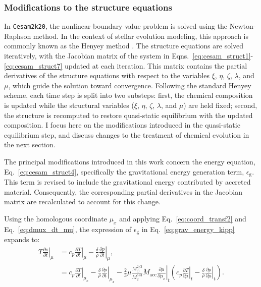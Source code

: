 \documentclass[12pt,a4paper]{article}
\newcommand{\mr}{\mathrm}
\newcommand{\pfird}[2][]{\frac{\partial#1}{\partial#2}}
\begin{document}
\subsubsection{Modifications to the structure equations}
\label{sec:accretion_struct_eq}

In \texttt{Cesam2k20}, the nonlinear boundary value problem is solved using the Newton-Raphson method. In the context of stellar evolution modeling, this approach is commonly known as the Henyey method \parencite{HenyeyEtAl1959}. The structure equations are solved iteratively, with the Jacobian matrix of the system in Eqns.~\eqref{eq:cesam_struct1}-\eqref{eq:cesam_struct7} updated at each iteration. This matrix contains the partial derivatives of the structure equations with respect to the variables $\xi$, $\eta$, $\zeta$, $\lambda$, and $\mu$, which guide the solution toward convergence. Following the standard Henyey scheme, each time step is split into two substeps: first, the chemical composition is updated while the structural variables ($\xi$, $\eta$, $\zeta$, $\lambda$, and $\mu$) are held fixed; second, the structure is recomputed to restore quasi-static equilibrium with the updated composition. I focus here on the modifications introduced in the quasi-static equilibrium step, and discuss changes to the treatment of chemical evolution in the next section.

The principal modifications introduced in this work concern the energy equation, Eq.~\eqref{eq:cesam_struct4}, specifically the gravitational energy generation term, $\epsilon_\mr{g}$. This term is revised to include the gravitational energy contributed by accreted material. Consequently, the corresponding partial derivatives in the Jacobian matrix are recalculated to account for this change.

Using the homologous coordinate $\mu_x$ and applying Eq.~\eqref{eq:coord_transf2} and Eq.~\eqref{eq:dmux_dt_mu}, the expression of $\epsilon_\mr{g}$ in Eq.~\eqref{eq:grav_energy_kipp} expands to:
\begin{align}
  T\left.\pfird[s]{t}\right|_\mu &= c_p\left.\pfird[T]{t}\right|_\mu - \frac{\delta}{\rho}\left.\pfird[p]{t}\right|_\mu, \nonumber\\
  &= c_p\left.\pfird[T]{t}\right|_{\mu_x} - \frac{\delta}{\rho}\left.\pfird[p]{t}\right|_{\mu_x} - 
  \frac{2}{3}\mu\frac{M_\odot^{2/3}}{M_2^{5/3}}\dot{M}_\mr{acc}\left.\pfird[\mu]{\mu_x}\right|_t\left(c_p\left.\pfird[T]{\mu}\right|_t - \frac{\delta}{\rho}\left.\pfird[p]{\mu}\right|_t\right). \label{eq:grav_energy_kipp_mux}
\end{align}
\end{document}
